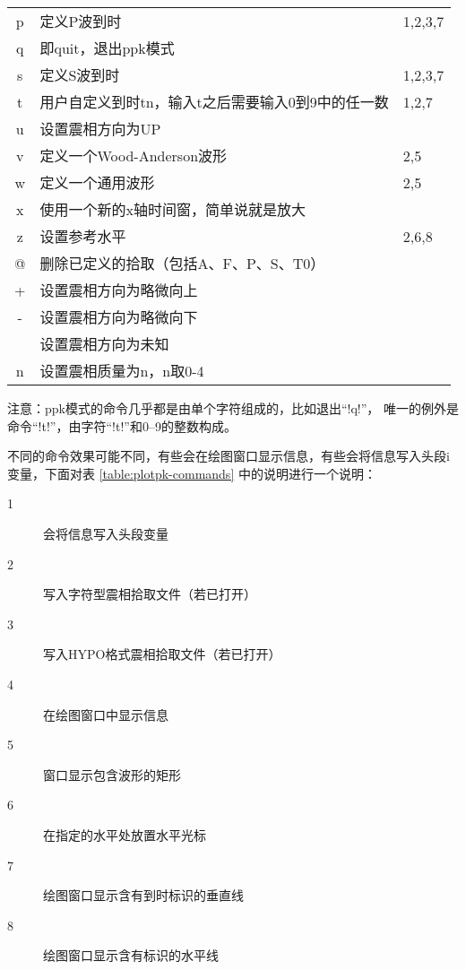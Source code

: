 \begin{center}
\begin{longtable}{cll}
p       &   定义P波到时                             &   1,2,3,7 \\
q       &   即quit，退出ppk模式                     &           \\
s       &   定义S波到时                             &   1,2,3,7 \\
t       &   用户自定义到时tn，输入t之后需要输入0到9中的任一数   &   1,2,7\\
u       &   设置震相方向为UP                        &           \\
v       &   定义一个Wood-Anderson波形               &   2,5     \\
w       &   定义一个通用波形                        &   2,5     \\
x       &   使用一个新的x轴时间窗，简单说就是放大   &           \\
z       &   设置参考水平                            &   2,6,8   \\
@       &   删除已定义的拾取（包括A、F、P、S、T0）  &           \\
+       &   设置震相方向为略微向上                  &           \\
-       &   设置震相方向为略微向下                  &           \\
\lstinline[showspaces]! !   &   设置震相方向为未知  &           \\
n       &   设置震相质量为n，n取0-4                 &           \\
\end{longtable}
\end{center}

注意：ppk模式的命令几乎都是由单个字符组成的，比如退出``!q!''，
唯一的例外是命令``!t!''，由字符``!t!''和0--9的整数构成。

不同的命令效果可能不同，有些会在绘图窗口显示信息，有些会将信息写入头段i
变量，下面对表 \ref{table:plotpk-commands} 中的说明进行一个说明：
\begin{description}
\item [1] 会将信息写入头段变量
\item [2] 写入字符型震相拾取文件（若已打开）
\item [3] 写入HYPO格式震相拾取文件（若已打开）
\item [4] 在绘图窗口中显示信息
\item [5] 窗口显示包含波形的矩形
\item [6] 在指定的水平处放置水平光标
\item [7] 绘图窗口显示含有到时标识的垂直线
\item [8] 绘图窗口显示含有标识的水平线
\end{description}

